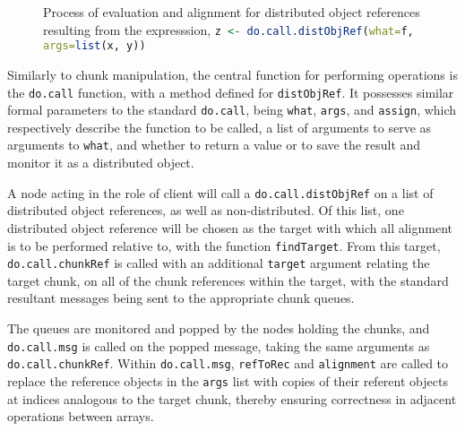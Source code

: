 \documentclass[a4paper,10pt]{article}
\begin{document}
\begin{figure}
	\caption{\label{fig:distobj}Process of evaluation and alignment for
	distributed object references resulting from the expresssion,
	\lstinline[language=R]{z <- do.call.distObjRef(what=f, args=list(x, y))}}
\end{figure}

Similarly to chunk manipulation, the central function for performing operations
is the \lstinline[language=R]{do.call} function, with a method defined for
\texttt{distObjRef}. It possesses similar formal parameters to the standard
\lstinline[language=R]{do.call}, being \texttt{what}, \texttt{args}, and
\texttt{assign}, which respectively describe the function to be called, a list
of arguments to serve as arguments to \texttt{what}, and whether to return a
value or to save the result and monitor it as a distributed object.

A node acting in the role of client will call a
\lstinline[language=R]{do.call.distObjRef} on a list of distributed object
references, as well as non-distributed.
Of this list, one distributed object reference will be chosen as the target
with which all alignment is to be performed relative to, with the function
\lstinline[language=R]{findTarget}.
From this target, \lstinline[language=R]{do.call.chunkRef} is called with an
additional \texttt{target} argument relating the target chunk, on all of the
chunk references within the target, with the standard resultant messages being
sent to the appropriate chunk queues.

The queues are monitored and popped by the nodes holding the chunks, and
\lstinline[language=R]{do.call.msg} is called on the popped message, taking the
same arguments as \lstinline[language=R]{do.call.chunkRef}.
Within \lstinline[language=R]{do.call.msg}, \lstinline[language=R]{refToRec}
and \lstinline[language=R]{alignment} are called to replace the reference
objects in the \texttt{args} list with copies of their referent objects at
indices analogous to the target chunk, thereby ensuring correctness in
adjacent operations between arrays.
\end{document}
